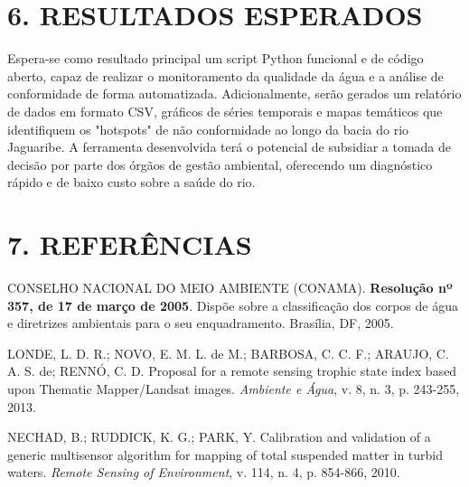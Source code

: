 \documentclass[12pt, a4paper]{article}
\begin{document}
    \section*{6. RESULTADOS ESPERADOS}
    Espera-se como resultado principal um script Python funcional e de código aberto, capaz de realizar o monitoramento da qualidade da água e a análise de conformidade de forma automatizada. Adicionalmente, serão gerados um relatório de dados em formato CSV, gráficos de séries temporais e mapas temáticos que identifiquem os "hotspots" de não conformidade ao longo da bacia do rio Jaguaribe. A ferramenta desenvolvida terá o potencial de subsidiar a tomada de decisão por parte dos órgãos de gestão ambiental, oferecendo um diagnóstico rápido e de baixo custo sobre a saúde do rio.

    \newpage

    \section*{7. REFERÊNCIAS}
    \begin{thebibliography}{9}

    CONSELHO NACIONAL DO MEIO AMBIENTE (CONAMA). \textbf{Resolução nº 357, de 17 de março de 2005}. Dispõe sobre a classificação dos corpos de água e diretrizes ambientais para o seu enquadramento. Brasília, DF, 2005.

    LONDE, L. D. R.; NOVO, E. M. L. de M.; BARBOSA, C. C. F.; ARAUJO, C. A. S. de; RENNÓ, C. D. Proposal for a remote sensing trophic state index based upon Thematic Mapper/Landsat images. \textit{Ambiente e Água}, v. 8, n. 3, p. 243-255, 2013.

    NECHAD, B.; RUDDICK, K. G.; PARK, Y. Calibration and validation of a generic multisensor algorithm for mapping of total suspended matter in turbid waters. \textit{Remote Sensing of Environment}, v. 114, n. 4, p. 854-866, 2010.

    \end{thebibliography}

    
\end{document}
